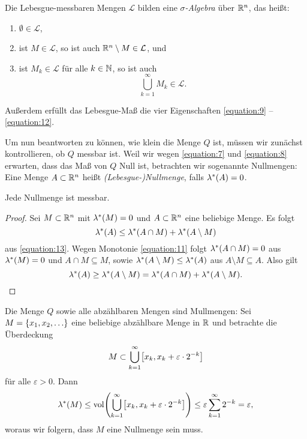 \begin{proposition}
	Die Lebesgue-messbaren Mengen \(\mathcal{L}\) bilden eine \emph{\(\sigma\)-Algebra} über \(\R^n\), das heißt:
	\begin{enumerate}
		\item \(\emptyset \in \mathcal{L}\),
		\item ist \(M \in \mathcal{L}\), so ist auch \(\R^n \setminus M \in \mathcal{L}\), und
		\item ist \(M_k \in \mathcal{L}\) für alle \(k \in \N\), so ist auch
		\[
			\bigcup_{k = 1}^\infty M_k \in \mathcal{L}.
		\]
	\end{enumerate}
	Außerdem erfüllt das Lebesgue-Maß die vier Eigenschaften \eqref{equation:9} -- \eqref{equation:12}.
\end{proposition}

Um nun beantworten zu können, wie klein die Menge \(Q\) ist, müssen wir zunächst kontrollieren, ob \(Q\) messbar ist.
Weil wir wegen \eqref{equation:7} und \eqref{equation:8} erwarten, dass das Maß von \(Q\) Null ist, betrachten wir sogenannte Nullmengen:
Eine Menge \(A \subset \R^n\) heißt \emph{(Lebesgue-)Nullmenge}, falls \(\lambda^*\parentheses*{A} = 0\).

\begin{lemma}
	Jede Nullmenge ist messbar.
\end{lemma}

\begin{proof}
	Sei \(M \subset \R^n\) mit \(\lambda^*\parentheses*{M} = 0\) und \(A \subset \R^n\) eine beliebige Menge.
	Es folgt
	\[
		\lambda^*\parentheses*{A} \le \lambda^*\parentheses*{A \cap M} + \lambda^*\parentheses*{A \setminus M}
	\]
	aus \eqref{equation:13}.
	Wegen Monotonie \eqref{equation:11} folgt \(\lambda^*\parentheses*{A \cap M} = 0\) aus \(\lambda^*\parentheses*{M} = 0\) und \(A \cap M \subseteq M\), sowie \(\lambda^*\parentheses*{A \setminus M} \le \lambda^*\parentheses*{A}\) aus \(A \setminus M \subseteq A\).
	Also gilt
	\[
		\lambda^*\parentheses*{A} \ge \lambda^*\parentheses*{A \setminus M} = \lambda^*\parentheses*{A \cap M} + \lambda^*\parentheses*{A \setminus M}.
	\]
\end{proof}

\begin{example}
	Die Menge \(Q\) sowie alle abzählbaren Mengen sind Mullmengen:
	Sei \(M = \braces*{x_1, x_2, \ldots}\) eine beliebige abzählbare Menge in \(\R\) und betrachte die Überdeckung
	\[
		M \subset \bigcup_{k = 1}^\infty \brackets*{x_k, x_k + \varepsilon \cdot 2^{-k}}
	\]
	für alle \(\varepsilon > 0\).
	Dann
	\[
		\lambda^*\parentheses*{M} \le \vol\parentheses*{\bigcup_{k = 1}^\infty \brackets*{x_k, x_k + \varepsilon \cdot 2^{-k}}} \le \varepsilon\sum_{k = 1}^\infty 2^{-k} = \varepsilon,
	\]
	woraus wir folgern, dass \(M\) eine Nullmenge sein muss.
\end{example}

